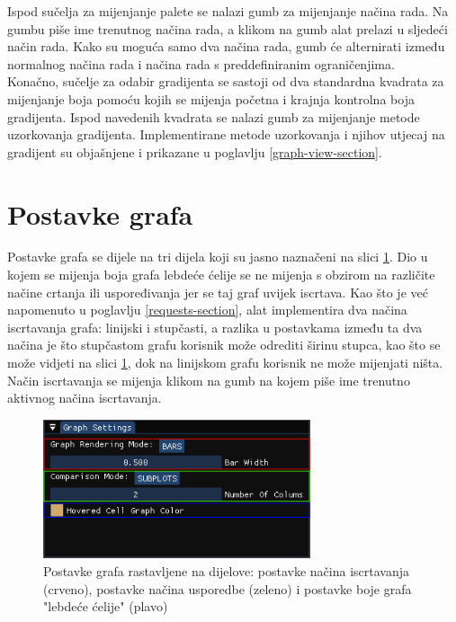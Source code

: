 \documentclass[times, utf8, diplomski]{fer}
\begin{document}
Ispod sučelja za mijenjanje palete se nalazi gumb za mijenjanje načina rada. Na gumbu piše ime trenutnog načina rada, a klikom na gumb alat prelazi u sljedeći način rada. Kako su moguća samo dva načina rada, gumb će alternirati između normalnog načina rada i načina rada s preddefiniranim ograničenjima.\\

Konačno, sučelje za odabir gradijenta se sastoji od dva standardna kvadrata za mijenjanje boja pomoću kojih se mijenja početna i krajnja kontrolna boja gradijenta. Ispod navedenih kvadrata se nalazi gumb za mijenjanje metode uzorkovanja gradijenta. Implementirane metode uzorkovanja i njihov utjecaj na gradijent su objašnjene i prikazane u poglavlju \ref{graph-view-section}.

\section{Postavke grafa} \label{graph-settings-section}

Postavke grafa se dijele na tri dijela koji su jasno naznačeni na slici \ref{fig:graph-settings-segmented}. Dio u kojem se mijenja boja grafa lebdeće ćelije se ne mijenja s obzirom na različite načine crtanja ili uspoređivanja jer se taj graf uvijek iscrtava. Kao što je već napomenuto u poglavlju \ref{requests-section}, alat implementira dva načina iscrtavanja grafa: linijski i stupčasti, a razlika u postavkama između ta dva načina je što stupčastom grafu korisnik može odrediti širinu stupca, kao što se može vidjeti na slici \ref{fig:graph-settings-segmented}, dok na linijskom grafu korisnik ne može mijenjati ništa. Način iscrtavanja se mijenja klikom na gumb na kojem piše ime trenutno aktivnog načina iscrtavanja.

\begin{figure} [H]
	\centering
    \includegraphics[width=0.7\textwidth]{graph_settings_subplots_segmented.png}
    \caption{Postavke grafa rastavljene na dijelove: postavke načina iscrtavanja (crveno), postavke načina usporedbe (zeleno) i postavke boje grafa "lebdeće ćelije" (plavo)}
    \label{fig:graph-settings-segmented}
\end{figure}
\end{document}
